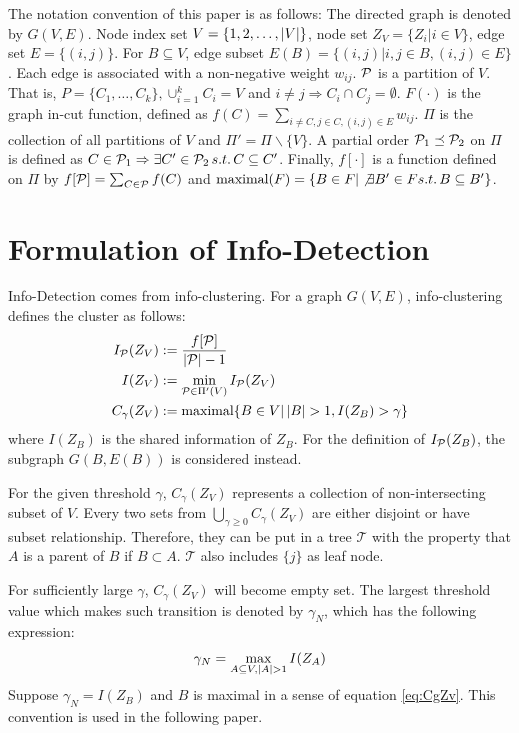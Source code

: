 \documentclass[runningheads]{llncs}
\begin{document}
The notation convention of this paper is as follows: The directed graph is denoted by $G(V, E)$. Node index set $V=\{1, 2,\dots, \abs{V}\}$, node set $Z_V=\{Z_i | i \in V\}$, edge set $E=\{(i, j)\}$. For $B\subseteq V$, edge subset $E(B) = \{(i,j)| i, j \in B,(i,j)\in E\}$. Each edge is associated with a non-negative weight $w_{ij}$. $\P$ is a partition of $V$. That is, $P=\{C_1, \dots, C_k\}, \cup_{i=1}^k C_i=V$ and $i\neq j \Rightarrow C_i \cap C_j =\emptyset $. $F(\cdot)$ is the graph in-cut function, defined as $f(C)=\sum_{i \neq C, j\in C, (i,j) \in E} w_{ij}$. $\Pi$ is the collection of all partitions of $V$ and $\Pi'=\Pi\backslash\{V\}$. A partial order $ \P_1 \preceq \P_2$ on $\Pi$ is defined as
$C \in \P_1 \Rightarrow \exists C' \in \P_2 \, s.t. \, C \subseteq C'$.
Finally, $f[\cdot]$ is a function defined on $\Pi$ by $f[\P]=\sum_{C\in \P}f(C)$ and $\textrm{maximal} (F)=\{B\in F | \not\exists B' \in F s.t.\, B \subseteq B'\}$.

\section{Formulation of Info-Detection}\label{sec:ID}
Info-Detection comes from info-clustering. For a graph $G(V,E)$, info-clustering defines the cluster as follows:
\begin{align}
I_{\P}(Z_V) & := \frac{ f[\P] }{  \abs{\mathcal{P}} - 1 }\\
I(Z_V) & := \min_{\mathcal{P} \in \Pi'(V)} I_{\mathcal{P}}(Z_V)  \label{eq:ms} \\
C_{\gamma}(Z_V) & := \textrm{maximal}\{ B \in V \vert \, \abs{B} > 1, I(Z_B) > \gamma \} \label{eq:CgZv}
\end{align}
where $I(Z_B)$ is the shared information of $Z_B$. For the definition of $I_{\P}(Z_B)$, the subgraph $G(B,E(B))$ is considered instead.

For the given threshold $\gamma$, $C_{\gamma} (Z_V)$ represents a collection of non-intersecting subset of $V$. Every two sets from $\bigcup_{\gamma \geq 0} C_{\gamma}(Z_V)$ are either disjoint or have subset relationship. Therefore, they can be put in a tree $\mathcal{T}$ with the property that $A$ is a parent of $B$ if $B\subset A$. $\mathcal{T}$ also includes $\{j\}$ as leaf node. 

For sufficiently large $\gamma$, $C_{\gamma} (Z_V)$ will become empty set. The largest threshold value which makes such transition is denoted by $\gamma_N$, which has the following expression:
\begin{equation}\label{eq:gammaN}
\gamma_N = \max_{A\subseteq V, \abs{A}>1} I(Z_A)
\end{equation}
Suppose $\gamma_N=I(Z_B)$ and $B$ is maximal in a sense of equation \eqref{eq:CgZv}. This convention is used in the following paper.
\end{document}
